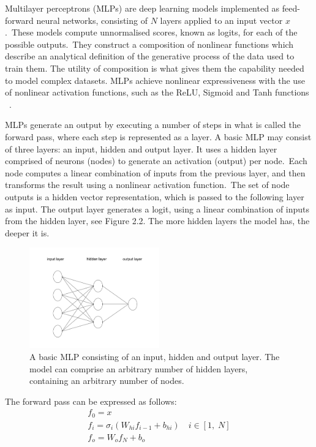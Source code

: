 \noindent Multilayer perceptrons (MLPs) are deep learning models implemented as feed-forward neural networks, consisting of $N$ layers applied to an input vector $ x $.\ These models compute unnormalised scores, known as logits, for each of the possible outputs.\ They construct a composition of nonlinear functions which describe an analytical definition of the generative process of the data used to train them. The utility of composition is what gives them the capability needed to model complex datasets. MLPs achieve nonlinear expressiveness with the use of nonlinear activation functions, such as the ReLU, Sigmoid and Tanh functions \unskip ~\citep{Goodfellow-et-al-2016}.  \par

\noindent MLPs generate an output by executing a number of steps in what is called the forward pass, where each step is represented as a layer. A basic MLP may consist of three layers: an input, hidden and output layer. It uses a hidden layer comprised of neurons (nodes) to generate an activation (output) per node.\ Each node computes a linear combination of inputs from the previous layer, and then transforms the result using a nonlinear activation function.\ The set of node outputs is a hidden vector representation, which is passed to the following layer as input. The output layer generates a logit, using a linear combination of inputs from the hidden layer, see Figure 2.2. The more hidden layers the model has, the deeper it is.

\begin{figure}[H]
   	\centering
    	\includegraphics[width=0.5\textwidth, height=0.3\textwidth]{multilayer_perceptron}
	\captionsetup{justification=centering}
	\caption{A basic MLP consisting of an input, hidden and output layer. The model can comprise an arbitrary number of hidden layers, containing an arbitrary number of nodes.}
\end{figure}

\noindent The forward pass can be expressed as follows:
\begin{subequations}
	\begin{gather}
		f_0 = x \\
		f_i=\sigma_i(W_{hi}f_{i - 1} + b_{hi}) \quad i \in [1, \; N] \\
		f_o = W_{o}f_N + b_o
	\end{gather}
\end{subequations}

